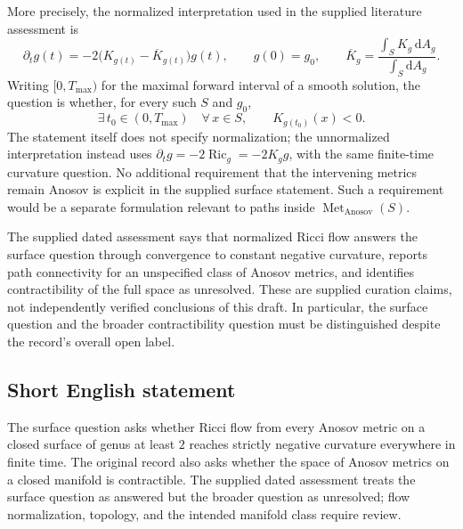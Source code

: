 \documentclass[11pt]{article}
\begin{document}
More precisely, the normalized interpretation used in the supplied literature assessment is
\[
\partial_tg(t)=-2\bigl(K_{g(t)}-\overline K_{g(t)}\bigr)g(t),\qquad g(0)=g_0,
\qquad
\overline K_g=\frac{\int_S K_g\,\mathrm dA_g}{\int_S\mathrm dA_g}.
\]
Writing \([0,T_{\max})\) for the maximal forward interval of a smooth solution, the question is whether, for every such \(S\) and \(g_0\),
\[
\exists\,t_0\in(0,T_{\max})\quad
\forall\,x\in S,\qquad K_{g(t_0)}(x)<0.
\]
The statement itself does not specify normalization; the unnormalized interpretation instead uses \(\partial_tg=-2\operatorname{Ric}_g=-2K_g g\), with the same finite-time curvature question. No additional requirement that the intervening metrics remain Anosov is explicit in the supplied surface statement. Such a requirement would be a separate formulation relevant to paths inside \(\operatorname{Met}_{\mathrm{Anosov}}(S)\).

The supplied dated assessment says that normalized Ricci flow answers the surface question through convergence to constant negative curvature, reports path connectivity for an unspecified class of Anosov metrics, and identifies contractibility of the full space as unresolved. These are supplied curation claims, not independently verified conclusions of this draft. In particular, the surface question and the broader contractibility question must be distinguished despite the record's overall open label.
\subsection{Short English statement}
The surface question asks whether Ricci flow from every Anosov metric on a closed surface of genus at least \(2\) reaches strictly negative curvature everywhere in finite time. The original record also asks whether the space of Anosov metrics on a closed manifold is contractible. The supplied dated assessment treats the surface question as answered but the broader question as unresolved; flow normalization, topology, and the intended manifold class require review.
\end{document}
